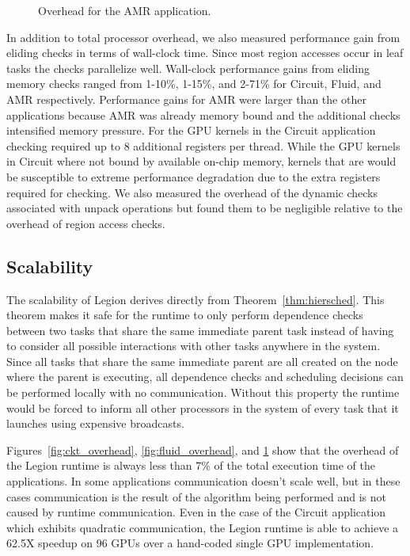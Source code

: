 \begin{figure}
\begin{center}
{\label{fig:amr16384}
}
\end{center}
\vspace{-2mm}
\caption{Overhead for the AMR application.\label{fig:amr_overhead}}
\vspace{-6mm}
\end{figure}

In addition to total processor overhead, we also measured performance gain from eliding checks in 
terms of wall-clock time.  Since most region accesses occur in leaf tasks the checks parallelize 
well.  Wall-clock performance gains from eliding memory checks ranged from 1-10\%, 1-15\%, 
and 2-71\% for Circuit, Fluid, and AMR respectively.  Performance gains for AMR were larger than
the other applications because AMR was already memory bound and the additional checks intensified
memory pressure.  For the GPU kernels in the Circuit application checking required up to 8 additional 
registers per thread.  While the GPU kernels in Circuit where not bound by 
available on-chip memory, kernels that are would be susceptible to extreme performance 
degradation due to the extra registers required for checking.  We also measured the overhead
of the dynamic checks associated with unpack operations but found them to be negligible relative
to the overhead of region access checks.

\subsection{Scalability}
\label{subsec:scalability}
The scalability of Legion derives directly from Theorem~\ref{thm:hiersched}.  This 
theorem makes it safe for the runtime to only perform dependence checks between two
tasks that share the same immediate parent task instead of having to consider all
possible interactions with other tasks anywhere in the system.  Since all tasks that
share the same immediate parent are all created on the node where the parent is executing,
all dependence checks and scheduling decisions can be performed locally with no communication.  
Without this property the runtime would be forced to inform all other processors in the system 
of every task that it launches using expensive broadcasts. 

Figures~\ref{fig:ckt_overhead}, \ref{fig:fluid_overhead}, and \ref{fig:amr_overhead} show that
the overhead of the Legion runtime is always less than 7\% of the total execution time
of the applications.  In some applications communication doesn't scale well, but in these cases communication is
the result of the algorithm being performed and is not caused by runtime communication.
Even in the case of the Circuit application which exhibits quadratic communication, the Legion
runtime is able to achieve a 62.5X speedup on 96 GPUs over a hand-coded single GPU implementation\cite{Legion12}.

